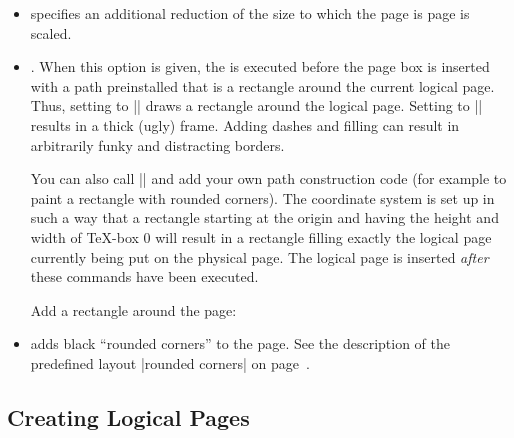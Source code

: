 \begin{command}{\pgfpageslogicalpageoptions{}}
\begin{itemize}
            \example Let logical page 2 show what logical page 1 showed on the
            just-shipped-out physical page:
\begin{codeexample}
\end{codeexample}
        \item {} specifies an additional
            reduction of the size to which the page is page is scaled.
        \item {}. When this option is given,
            the  is executed before the page box is inserted with a
            path preinstalled that is a rectangle around the current logical
            page. Thus, setting  to |\pgfstroke| draws a rectangle
            around the logical page. Setting  to
            |\pgfsetlinewidth{3pt}\pgfstroke| results in a thick (ugly) frame.
            Adding dashes and filling can result in arbitrarily funky and
            distracting borders.

            You can also call |\pgfdiscardpath| and add your own path
            construction code (for example to paint a rectangle with rounded
            corners). The coordinate system is set up in such a way that a
            rectangle starting at the origin and having the height and width of
            \TeX-box 0 will result in a rectangle filling exactly the logical
            page currently being put on the physical page. The logical page is
            inserted \emph{after} these commands have been executed.

            \example Add a rectangle around the page:
\begin{codeexample}
\end{codeexample}
        \item {} adds black ``rounded
            corners'' to the page. See the description of the predefined layout
            |rounded corners| on page~\pageref{layout-rounded-corners}.
    \end{itemize}
\end{command}


\subsection{Creating Logical Pages}

